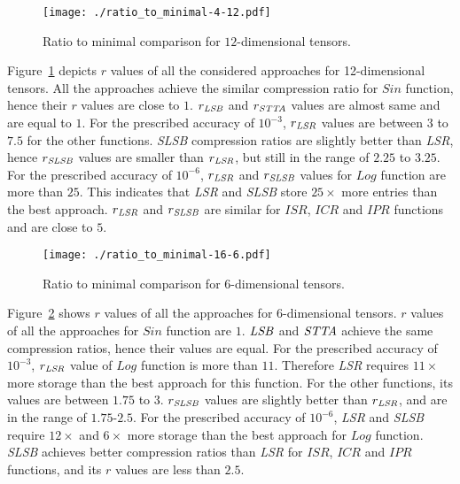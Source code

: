 \documentclass[sigconf]{acmart}
\newcommand{\hfirst}{{\it LSR}\xspace}
\newcommand{\hsecond}{{\it SLSB}\xspace}
\newcommand{\hthird}{{\it LSB}\xspace}
\newcommand{\otta}{{\it STTA}\xspace}
\begin{document}
\begin{figure}[!htb]
	\begin{center}
		\texttt{[image: ./ratio\_to\_minimal-4-12.pdf]}
	\end{center}
	\caption{\small Ratio to minimal comparison for $12$-dimensional tensors.\label{fig:rtm-12}}
\end{figure}

Figure~\ref{fig:rtm-12} depicts $r$ values of all the considered approaches for 12-dimensional tensors. All the approaches achieve the similar compression ratio for $Sin$ function, hence their $r$ values are close to $1$. $r_ {\hthird}$ and $r_ {\otta}$ values are almost same and are equal to $1$. For the prescribed accuracy of $10^{-3}$, $r_ {\hfirst}$ values are between $3$ to $7.5$ for the other functions. \hsecond compression ratios are slightly better than \hfirst, hence $r_ {\hsecond}$ values are smaller than $r_ {\hfirst}$, but still in the range of $2.25$ to $3.25$. For the prescribed accuracy of $10^{-6}$, $r_ {\hfirst}$ and $r_ {\hsecond}$ values for $Log$ function are more than $25$. This indicates that \hfirst and \hsecond store $25\times$ more entries than the best approach. $r_ {\hfirst}$ and $r_ {\hsecond}$ are similar for $ISR$, $ICR$ and $IPR$ functions and are close to $5$. 

\begin{figure}[!htb]
	\begin{center}
		\texttt{[image: ./ratio\_to\_minimal-16-6.pdf]}
	\end{center}
	\caption{Ratio to minimal comparison for $6$-dimensional tensors.\label{fig:rtm-6}}
\end{figure}

Figure~\ref{fig:rtm-6} shows $r$ values of all the approaches for $6$-dimensional tensors. $r$ values of all the approaches for $Sin$ function are $1$. $ {\hthird}$ and $ {\otta}$ achieve the same compression ratios, hence their values are equal. For the prescribed accuracy of $10^{-3}$, $r_ {\hfirst}$ value of $Log$ function is more than $11$. Therefore \hfirst requires $11\times$ more storage than the best approach for this function. For the other functions, its values are between $1.75$ to $3$. $r_ {\hsecond}$ values are slightly better than $r_ {\hfirst}$, and are in the range of $1.75$-$2.5$. For the prescribed accuracy of $10^{-6}$, \hfirst and \hsecond require $12\times$ and $6\times$ more storage than the best approach for $Log$ function. \hsecond achieves better compression ratios than \hfirst for $ISR$, $ICR$ and $IPR$ functions, and its $r$ values are less than $2.5$.
\end{document}
